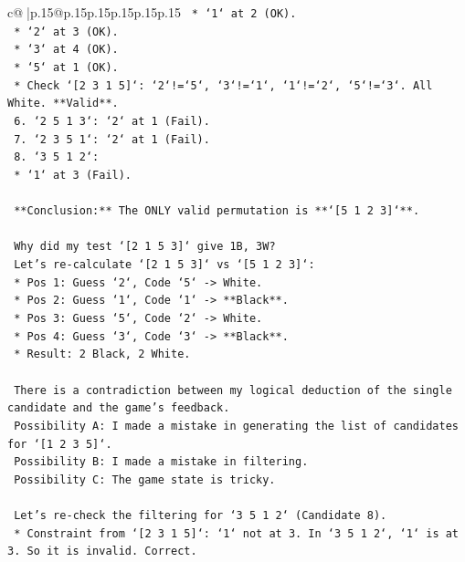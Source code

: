 \documentclass{article}
\begin{document}
{\begin{supertabular}{c@{$\;$}|p{.15\linewidth}@{}p{.15\linewidth}p{.15\linewidth}p{.15\linewidth}p{.15\linewidth}p{.15\linewidth}}
{{{\texttt{        *   `1` at 2 (OK).} \\
\texttt{        *   `2` at 3 (OK).} \\
\texttt{        *   `3` at 4 (OK).} \\
\texttt{        *   `5` at 1 (OK).} \\
\texttt{        *   Check `{[}2 3 1 5{]}`: `2`!=`5`, `3`!=`1`, `1`!=`2`, `5`!=`3`. All White. **Valid**.} \\
\texttt{    6.  `2 5 1 3`: `2` at 1 (Fail).} \\
\texttt{    7.  `2 3 5 1`: `2` at 1 (Fail).} \\
\texttt{    8.  `3 5 1 2`:} \\
\texttt{        *   `1` at 3 (Fail).} \\
\\ 
\texttt{    **Conclusion:** The ONLY valid permutation is **`{[}5 1 2 3{]}`**.} \\
\\ 
\texttt{    Why did my test `{[}2 1 5 3{]}` give 1B, 3W?} \\
\texttt{    Let's re{-}calculate `{[}2 1 5 3{]}` vs `{[}5 1 2 3{]}`:} \\
\texttt{    *   Pos 1: Guess `2`, Code `5` {-}> White.} \\
\texttt{    *   Pos 2: Guess `1`, Code `1` {-}> **Black**.} \\
\texttt{    *   Pos 3: Guess `5`, Code `2` {-}> White.} \\
\texttt{    *   Pos 4: Guess `3`, Code `3` {-}> **Black**.} \\
\texttt{    *   Result: 2 Black, 2 White.} \\
\\ 
\texttt{    There is a contradiction between my logical deduction of the single candidate and the game's feedback.} \\
\texttt{    Possibility A: I made a mistake in generating the list of candidates for `{[}1 2 3 5{]}`.} \\
\texttt{    Possibility B: I made a mistake in filtering.} \\
\texttt{    Possibility C: The game state is tricky.} \\
\\ 
\texttt{    Let's re{-}check the filtering for `3 5 1 2` (Candidate 8).} \\
\texttt{    *   Constraint from `{[}2 3 1 5{]}`: `1` not at 3. In `3 5 1 2`, `1` is at 3. So it is invalid. Correct.} \\
\\ 
}}}
\end{supertabular}}
\end{document}

